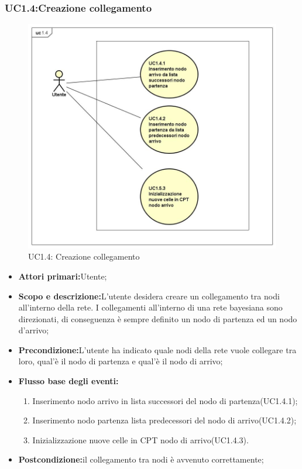 \subsubsection{UC1.4:Creazione collegamento}
\begin{figure} [H]
	\centering
	\includegraphics[scale=0.45]{Img/UC1-4}
	\caption{UC1.4: Creazione collegamento}\label{}
\end{figure}
\begin{itemize}
	\item{\textbf{Attori primari:}Utente;}
	\item{\textbf{Scopo e descrizione:}L'utente desidera creare un collegamento tra nodi all'interno della rete. I collegamenti all'interno di una rete bayesiana sono direzionati, di conseguenza è sempre definito un nodo di partenza ed un nodo d'arrivo;}
	\item{\textbf{Precondizione:}L'utente ha indicato quale nodi della rete vuole collegare tra loro, qual'è il nodo di partenza e qual'è il nodo di arrivo;}
	\item{\textbf{Flusso base degli eventi:}}
		\begin{enumerate}
			\item{Inserimento nodo arrivo in lista successori del nodo di partenza(UC1.4.1);}
			\item{Inserimento nodo partenza lista predecessori del nodo di arrivo(UC1.4.2);}
			\item{Inizializzazione nuove celle in CPT nodo di arrivo(UC1.4.3).}
		\end{enumerate}
	\item{\textbf{Postcondizione:}il collegamento tra nodi è avvenuto correttamente;}
\end{itemize}
